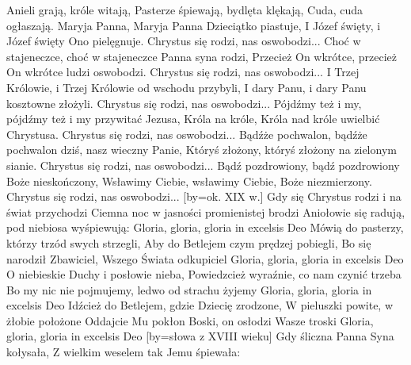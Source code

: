     Anieli grają, króle witają,
    Pasterze śpiewają, bydlęta klękają,
    Cuda, cuda ogłaszają.
\endchorus
\beginverse
    Maryja Panna, Maryja Panna Dzieciątko piastuje,
    I Józef święty, i Józef święty Ono pielęgnuje.
\endverse
\beginchorus
    Chrystus się rodzi, nas oswobodzi...
\endchorus
\beginverse
    Choć w stajeneczce, choć w stajeneczce Panna syna rodzi,
    Przecież On wkrótce, przecież On wkrótce ludzi oswobodzi.
\endverse
\beginchorus
    Chrystus się rodzi, nas oswobodzi...
\endchorus
\beginverse
    I Trzej Królowie, i Trzej Królowie od wschodu przybyli,
    I dary Panu, i dary Panu kosztowne złożyli.
\endverse
\beginchorus
    Chrystus się rodzi, nas oswobodzi...
\endchorus
\beginverse
    Pójdźmy też i my, pójdźmy też i my przywitać Jezusa,
    Króla na króle, Króla nad króle uwielbić Chrystusa.
\endverse
\beginchorus
    Chrystus się rodzi, nas oswobodzi...
\endchorus
\beginverse
    Bądźże pochwalon, bądźże pochwalon dziś, nasz wieczny Panie,
    Któryś złożony, któryś złożony na zielonym sianie.
\endverse
\beginchorus
    Chrystus się rodzi, nas oswobodzi...
\endchorus
\beginverse
    Bądź pozdrowiony, bądź pozdrowiony Boże nieskończony,
    Wsławimy Ciebie, wsławimy Ciebie, Boże niezmierzony.
\endverse
\beginchorus
    Chrystus się rodzi, nas oswobodzi...
\endchorus
\endsong
[by={ok. XIX w.}]
\beginverse
    Gdy się Chrystus rodzi i na świat przychodzi
    Ciemna noc w jasności promienistej brodzi
    Aniołowie się radują, pod niebiosa wyśpiewują:
\endverse
\beginchorus
        Gloria, gloria, gloria in excelsis Deo
\endchorus
\beginverse
    Mówią do pasterzy, którzy trzód swych strzegli,
    Aby do Betlejem czym prędzej pobiegli,
    Bo się narodził Zbawiciel, Wszego Świata odkupiciel
\endverse
\beginchorus
        Gloria, gloria, gloria in excelsis Deo
\endchorus
\beginverse
    O niebieskie Duchy i posłowie nieba,
    Powiedzcież wyraźnie, co nam czynić trzeba
    Bo my nic nie pojmujemy, ledwo od strachu żyjemy
\endverse
\beginchorus
        Gloria, gloria, gloria in excelsis Deo
\endchorus
\beginverse
    Idźcież do Betlejem, gdzie Dziecię zrodzone,
    W pieluszki powite, w żłobie położone
    Oddajcie Mu pokłon Boski, on osłodzi Wasze troski
\endverse
\beginchorus
        Gloria, gloria, gloria in excelsis Deo
\endchorus
\endsong
[by={słowa z XVIII wieku}]
\beginverse
    Gdy śliczna Panna Syna kołysała,
    Z wielkim weselem tak Jemu śpiewała:

